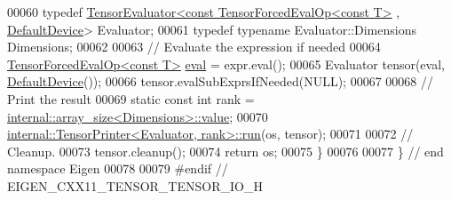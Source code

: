 \begin{DoxyCode}
00060   \textcolor{keyword}{typedef} \hyperlink{struct_eigen_1_1_tensor_evaluator}{TensorEvaluator<const TensorForcedEvalOp<const T>}
      , \hyperlink{struct_eigen_1_1_default_device}{DefaultDevice}> Evaluator;
00061   \textcolor{keyword}{typedef} \textcolor{keyword}{typename} Evaluator::Dimensions Dimensions;
00062 
00063   \textcolor{comment}{// Evaluate the expression if needed}
00064   \hyperlink{class_eigen_1_1_tensor_forced_eval_op}{TensorForcedEvalOp<const T>} \hyperlink{struct_eigen_1_1internal_1_1eval}{eval} = expr.eval();
00065   Evaluator tensor(eval, \hyperlink{struct_eigen_1_1_default_device}{DefaultDevice}());
00066   tensor.evalSubExprsIfNeeded(NULL);
00067 
00068   \textcolor{comment}{// Print the result}
00069   \textcolor{keyword}{static} \textcolor{keyword}{const} \textcolor{keywordtype}{int} rank = \hyperlink{struct_eigen_1_1internal_1_1array__size}{internal::array\_size<Dimensions>::value};
00070   \hyperlink{struct_eigen_1_1internal_1_1_tensor_printer}{internal::TensorPrinter<Evaluator, rank>::run}(os, tensor);
00071 
00072   \textcolor{comment}{// Cleanup.}
00073   tensor.cleanup();
00074   \textcolor{keywordflow}{return} os;
00075 \}
00076 
00077 \} \textcolor{comment}{// end namespace Eigen}
00078 
00079 \textcolor{preprocessor}{#endif // EIGEN\_CXX11\_TENSOR\_TENSOR\_IO\_H}
\end{DoxyCode}
